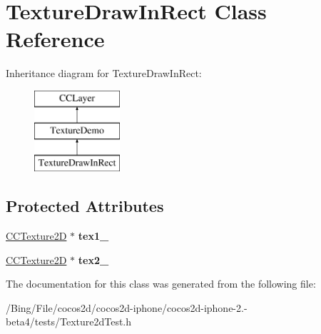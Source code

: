 \hypertarget{interface_texture_draw_in_rect}{\section{Texture\-Draw\-In\-Rect Class Reference}
\label{interface_texture_draw_in_rect}
}
Inheritance diagram for Texture\-Draw\-In\-Rect\-:\begin{figure}[H]
\begin{center}
\leavevmode
\includegraphics[height=3.000000cm]{interface_texture_draw_in_rect}
\end{center}
\end{figure}
\subsection*{Protected Attributes}
\begin{DoxyCompactItemize}
\item 
\hypertarget{interface_texture_draw_in_rect_aaf48993be177939908ccce780c0e5a9f}{\hyperlink{class_c_c_texture2_d}{C\-C\-Texture2\-D} $\ast$ {\bfseries tex1\-\_\-}}\label{interface_texture_draw_in_rect_aaf48993be177939908ccce780c0e5a9f}

\item 
\hypertarget{interface_texture_draw_in_rect_a08d046aa9adfadc0e84b135248b24b0f}{\hyperlink{class_c_c_texture2_d}{C\-C\-Texture2\-D} $\ast$ {\bfseries tex2\-\_\-}}\label{interface_texture_draw_in_rect_a08d046aa9adfadc0e84b135248b24b0f}

\end{DoxyCompactItemize}


The documentation for this class was generated from the following file\-:\begin{DoxyCompactItemize}
\item 
/\-Bing/\-File/cocos2d/cocos2d-\/iphone/cocos2d-\/iphone-\/2.-\/beta4/tests/Texture2d\-Test.\-h\end{DoxyCompactItemize}
